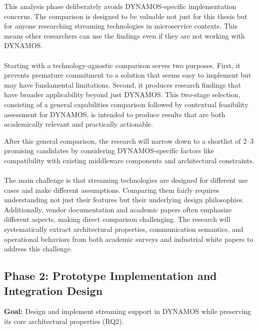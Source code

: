 \documentclass[a4paper,10pt,british]{scrartcl}
\begin{document}
This analysis phase deliberately avoids DYNAMOS-specific implementation concerns. The comparison is designed to be valuable not just for this thesis but for anyone researching streaming technologies in microservice contexts. This means other researchers can use the findings even if they are not working with DYNAMOS.

\paragraph{}

Starting with a technology-agnostic comparison serves two purposes. First, it prevents premature commitment to a solution that seems easy to implement but may have fundamental limitations. Second, it produces research findings that have broader applicability beyond just DYNAMOS. This two-stage selection, consisting of a general capabilities comparison followed by contextual feasibility assessment for DYNAMOS, is intended to produce results that are both academically relevant and practically actionable.

After this general comparison, the research will narrow down to a shortlist of 2--3 promising candidates by considering DYNAMOS-specific factors like compatibility with existing middleware components and architectural constraints.

\paragraph{}

The main challenge is that streaming technologies are designed for different use cases and make different assumptions. Comparing them fairly requires understanding not just their features but their underlying design philosophies. Additionally, vendor documentation and academic papers often emphasize different aspects, making direct comparison challenging. The research will systematically extract architectural properties, communication semantics, and operational behaviors from both academic surveys and industrial white papers to address this challenge.

\subsection{Phase 2: Prototype Implementation and Integration Design}

\textbf{Goal:} Design and implement streaming support in DYNAMOS while preserving its core architectural properties (RQ2).
\end{document}
